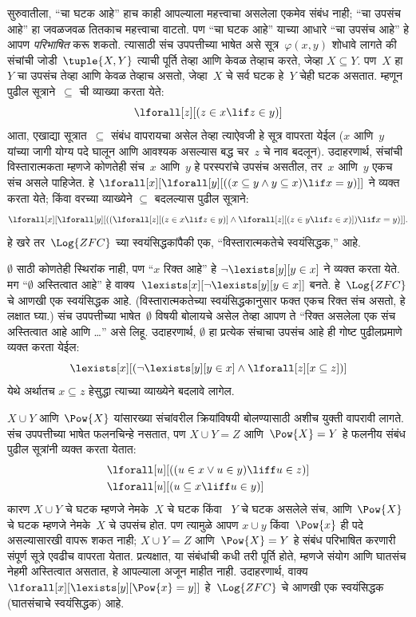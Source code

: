 सुरुवातीला, ``चा घटक आहे'' हाच काही आपल्याला महत्त्वाचा असलेला एकमेव संबंध
नाही; ``चा उपसंच आहे'' हा जवळजवळ तितकाच महत्त्वाचा वाटतो. पण ``चा घटक
आहे'' याच्या आधारे ``चा उपसंच आहे'' हे आपण \emph{परिभाषित} करू शकतो. त्यासाठी
संच उपपत्तीच्या भाषेत असे सूत्र~$\varphi(x, y)$ शोधावे लागते की संचांची
जोडी~$\tuple{X, Y}$ त्याची पूर्ति तेव्हा आणि केवळ तेव्हाच करते, जेव्हा
$X \subseteq Y$. पण~$X$ हा~$Y$ चा उपसंच तेव्हा आणि केवळ तेव्हाच असतो,
जेव्हा~$X$ चे सर्व घटक हे~$Y$ चेही घटक असतात. म्हणून
पुढील सूत्राने~$\subseteq$ ची व्याख्या करता येते:
\[\lforall[z][(z \in x \lif z \in y)]
\]
आता, एखाद्या सूत्रात~$\subseteq$ संबंध वापरायचा असेल तेव्हा त्याऐवजी हे
सूत्र वापरता येईल ($x$ आणि~$y$ यांच्या जागी योग्य पदे घालून आणि आवश्यक
असल्यास बद्ध चर~$z$ चे नाव बदलून). उदाहरणार्थ, संचांची विस्तारात्मकता
म्हणजे कोणतेही संच~$x$ आणि~$y$ हे परस्परांचे उपसंच असतील, तर~$x$ आणि~$y$
एकच संच असले पाहिजेत. हे
$\lforall[x][\lforall[y][((x \subseteq y \land y
    \subseteq x) \lif x = y)]]$ ने व्यक्त करता येते; किंवा वरच्या व्याख्येने
$\subseteq$ बदलल्यास पुढील सूत्राने:
\[\lforall[x][\lforall[y][((\lforall[z][(z \in x \lif z \in y)] \land
    \lforall[z][(z \in y \lif z \in x)]) \lif x = y)]].
\]
हे खरे तर~$\Log{ZFC}$ च्या स्वयंसिद्धकांपैकी एक, ``विस्तारात्मकतेचे
स्वयंसिद्धक,'' आहे.

$\emptyset$ साठी कोणतेही स्थिरांक नाही, पण ``$x$ रिक्त आहे'' हे
$\lnot \lexists[y][y \in x]$ ने व्यक्त करता येते. मग ``$\emptyset$
अस्तित्वात आहे'' हे वाक्य~$\lexists[x][\lnot \lexists[y][y \in
    x]]$ बनते. हे~$\Log{ZFC}$ चे आणखी एक स्वयंसिद्धक आहे. (विस्तारात्मकतेच्या
स्वयंसिद्धकानुसार फक्त एकच रिक्त संच असतो, हे लक्षात घ्या.) संच उपपत्तीच्या
भाषेत~$\emptyset$ विषयी बोलायचे असेल तेव्हा आपण ते ``रिक्त असलेला एक संच
अस्तित्वात आहे आणि \dots'' असे लिहू. उदाहरणार्थ, $\emptyset$ हा प्रत्येक संचाचा
उपसंच आहे ही गोष्ट पुढीलप्रमाणे व्यक्त करता येईल:
\[\lexists[x][(\lnot\lexists[y][y \in x] \land \lforall[z][x \subseteq
    z])]
\]
येथे अर्थातच $x \subseteq z$ हेसुद्धा त्याच्या व्याख्येने बदलावे लागेल.

$X \cup Y$ आणि~$\Pow{X}$ यांसारख्या संचांवरील क्रियांविषयी बोलण्यासाठी
अशीच युक्ती वापरावी लागते. संच उपपत्तीच्या भाषेत फलनचिन्हे नसतात, पण
$X \cup Y = Z$ आणि~$\Pow{X} = Y$ हे फलनीय संबंध पुढील सूत्रांनी व्यक्त
करता येतात:
\begin{align*}
& \lforall[u][((u \in x \lor u \in y) \liff u \in z)]\\
& \lforall[u][(u \subseteq x \liff u \in y )]
\end{align*}
कारण $X \cup Y$ चे घटक म्हणजे नेमके~$X$ चे घटक किंवा
~$Y$ चे घटक असलेले संच, आणि~$\Pow{X}$ चे घटक म्हणजे नेमके~$X$
चे उपसंच होत. पण त्यामुळे आपण $x \cup y$ किंवा~$\Pow{x}$ ही पदे असल्यासारखी
वापरू शकत नाही; $X \cup Y = Z$ आणि~$\Pow{X} = Y$ हे संबंध परिभाषित करणारी
संपूर्ण सूत्रे एवढीच वापरता येतात. प्रत्यक्षात, या संबंधांची कधी तरी
पूर्ति होते, म्हणजे संयोग आणि घातसंच नेहमी अस्तित्वात असतात, हे आपल्याला
अजून माहीत नाही. उदाहरणार्थ, वाक्य
$\lforall[x][\lexists[y][\Pow{x} = y]]$ हे~$\Log{ZFC}$ चे आणखी एक
स्वयंसिद्धक (घातसंचाचे स्वयंसिद्धक) आहे.

